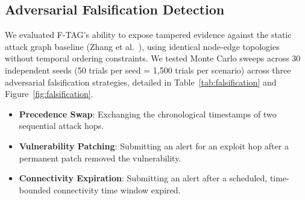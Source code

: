 \documentclass[12pt]{article}
\begin{document}
\subsection{Adversarial Falsification Detection}\label{sec:results-falsification}

We evaluated F-TAG's ability to expose tampered evidence against the static attack graph baseline (Zhang et al.~\cite{zhang2015detecting}), using identical node-edge topologies without temporal ordering constraints. We tested Monte Carlo sweeps across 30 independent seeds (50 trials per seed = 1,500 trials per scenario) across three adversarial falsification strategies, detailed in Table~\ref{tab:falsification} and Figure~\ref{fig:falsification}.
\begin{itemize}
    \item \textbf{Precedence Swap}: Exchanging the chronological timestamps of two sequential attack hops.
    \item \textbf{Vulnerability Patching}: Submitting an alert for an exploit hop after a permanent patch removed the vulnerability.
    \item \textbf{Connectivity Expiration}: Submitting an alert after a scheduled, time-bounded connectivity time window expired.
\end{itemize}
\end{document}
